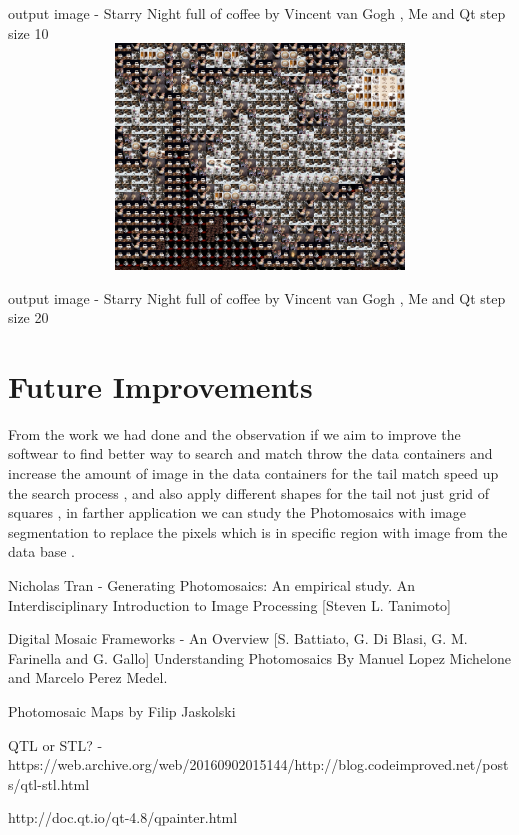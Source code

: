 \documentclass[a4paper,12pt]{report}
\begin{document}
\begin{center}
		{output image - Starry Night full of coffee by Vincent van Gogh , Me and Qt step size 10 }\\
		
			\includegraphics[width=14cm, height=6cm, 
		keepaspectratio]{output-20} 
		
		{output image - Starry Night full of coffee by Vincent van Gogh , Me and Qt step size 20 }\\
		
		
	\end{center}
	
	
	
	\chapter{Future Improvements}

	From the work we had done and the observation if we aim to improve the softwear to find better way to search and match throw the data containers and increase the amount of image in the data containers for the tail match speed up the search process , and also apply different shapes for the tail not just grid of squares , in farther application we can study the Photomosaics  with image segmentation to replace the pixels which is in specific region with image from the data base .

	
	 
	\begin{thebibliography}{9}
		 Nicholas Tran - Generating Photomosaics: An empirical study.
		An Interdisciplinary Introduction to Image Processing [Steven L. Tanimoto]
		
		Digital Mosaic Frameworks - An Overview  [S. Battiato, G. Di Blasi, G. M. Farinella and G. Gallo]
		Understanding Photomosaics By Manuel Lopez Michelone and Marcelo Perez Medel.
		
		 Photomosaic Maps by Filip Jaskolski
		
		 QTL or STL? - https://web.archive.org/web/20160902015144/http://blog.codeimproved.net/posts/qtl-stl.html
		
		 http://doc.qt.io/qt-4.8/qpainter.html
		
		
	
	\end{thebibliography}
	
\end{document}
